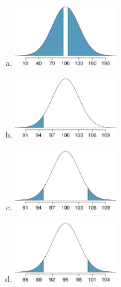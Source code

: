 \documentclass[11pt,containsverbatim,handout,xcolor=xelatex,dvipsnames,table]{beamer}
\begin{document}

\begin{frame}
\frametitle{}


\begin{multicols}{2}
\begin{enumerate}[(a)]
\item \includegraphics[width=0.35\textwidth]{figures/ht_curves/a}
\item \includegraphics[width=0.35\textwidth]{figures/ht_curves/b}
\item \includegraphics[width=0.35\textwidth]{figures/ht_curves/c}
\item \includegraphics[width=0.35\textwidth]{figures/ht_curves/d}
\end{enumerate}
\end{multicols}

\end{frame}

\end{document}
